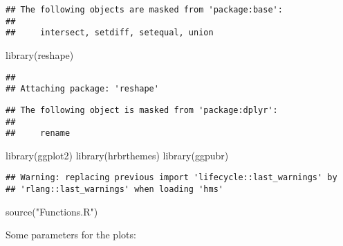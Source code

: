 \documentclass[
]{article}
\newenvironment{Shaded}{\begin{snugshade}}{\end{snugshade}}
\newcommand{\FunctionTok}[1]{\textcolor[rgb]{0.00,0.00,0.00}{#1}}
\newcommand{\NormalTok}[1]{#1}
\newcommand{\StringTok}[1]{\textcolor[rgb]{0.31,0.60,0.02}{#1}}
\begin{document}
\begin{verbatim}
## The following objects are masked from 'package:base':
## 
##     intersect, setdiff, setequal, union
\end{verbatim}

\begin{Shaded}
\begin{Highlighting}[]
\FunctionTok{library}\NormalTok{(reshape)}
\end{Highlighting}
\end{Shaded}

\begin{verbatim}
## 
## Attaching package: 'reshape'
\end{verbatim}

\begin{verbatim}
## The following object is masked from 'package:dplyr':
## 
##     rename
\end{verbatim}

\begin{Shaded}
\begin{Highlighting}[]
\FunctionTok{library}\NormalTok{(ggplot2)}
\FunctionTok{library}\NormalTok{(hrbrthemes)}
\FunctionTok{library}\NormalTok{(ggpubr)}
\end{Highlighting}
\end{Shaded}

\begin{verbatim}
## Warning: replacing previous import 'lifecycle::last_warnings' by
## 'rlang::last_warnings' when loading 'hms'
\end{verbatim}

\begin{Shaded}
\begin{Highlighting}[]
\FunctionTok{source}\NormalTok{(}\StringTok{"Functions.R"}\NormalTok{)}
\end{Highlighting}
\end{Shaded}

Some parameters for the plots:
\end{document}
